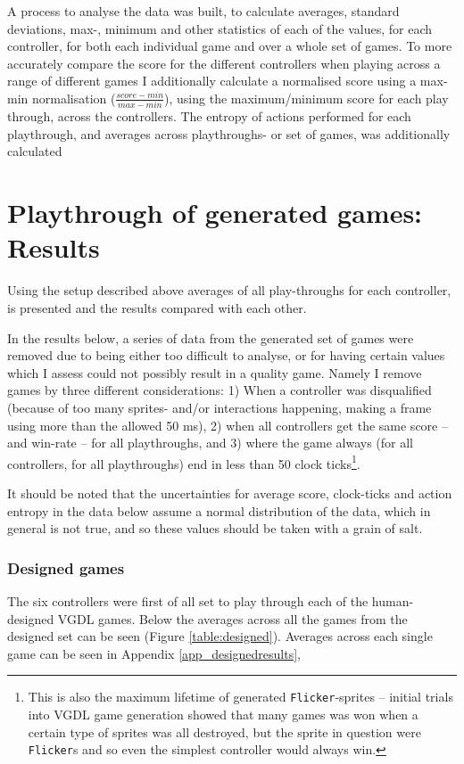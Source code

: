 \documentclass[a4paper,titlepage,final]{report}
\begin{document}
A process to analyse the data was built, to calculate averages, standard deviations, max-, minimum and other statistics of each of the values, for each controller, for both each individual game and over a whole set of games.
To more accurately compare the score for the different controllers when playing across a range of different games  I additionally calculate a normalised score using a max-min normalisation ($\frac{score-min}{max-min}$), using the maximum/minimum score for each play through, across the controllers. 
The entropy of actions performed for each playthrough, and averages across playthroughs- or set of games, was additionally calculated

\section{Playthrough of generated games: Results}
\label{sec_task1inittestresults}
Using the setup described above averages of all play-throughs for each controller, is presented and the results compared with each other.

In the results below, a series of data from the generated set of games were removed due to being either too difficult to analyse, or for having certain values which I assess could not possibly result in a quality game.
Namely I remove games by three different considerations: 
1) When a controller was disqualified (because of too many sprites- and/or interactions happening, making a frame using more than the allowed 50 ms), 2) when all controllers get the same score -- and win-rate -- for all playthroughs, and 3) where the game always (for all controllers, for all playthroughs) end in less than 50 clock ticks\footnote{This is also the maximum lifetime of generated \texttt{Flicker}-sprites -- initial trials into VGDL game generation showed that many games was won when a certain type of sprites was all destroyed, but the sprite in question were \texttt{Flicker}s and so even the simplest controller would always win.}.

It should be noted that the uncertainties for average score, clock-ticks and action entropy in the data below assume a normal distribution of the data, which in general is not true, and so these values should be taken with a grain of salt.

\subsubsection*{Designed games}
The six controllers were first of all set to play through each of the human-designed VGDL games.
Below the averages across all the games from the designed set can be seen (Figure \ref{table:designed}). 
Averages across each single game can be seen in Appendix \ref{app_designedresults}, 
\end{document}

